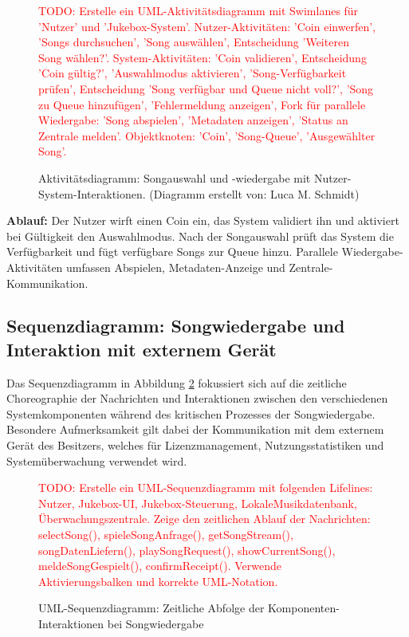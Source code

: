 \documentclass[12pt,oneside]{article}
\newcommand{\todo}[1]{\textcolor{red}{TODO: #1}}
\begin{document}
\begin{figure}[H]
    \centering
    \todo{Erstelle ein UML-Aktivitätsdiagramm mit Swimlanes für 'Nutzer' und 'Jukebox-System'. Nutzer-Aktivitäten: 'Coin einwerfen', 'Songs durchsuchen', 'Song auswählen', Entscheidung 'Weiteren Song wählen?'. System-Aktivitäten: 'Coin validieren', Entscheidung 'Coin gültig?', 'Auswahlmodus aktivieren', 'Song-Verfügbarkeit prüfen', Entscheidung 'Song verfügbar und Queue nicht voll?', 'Song zu Queue hinzufügen', 'Fehlermeldung anzeigen', Fork für parallele Wiedergabe: 'Song abspielen', 'Metadaten anzeigen', 'Status an Zentrale melden'. Objektknoten: 'Coin', 'Song-Queue', 'Ausgewählter Song'.}
    \caption{Aktivitätsdiagramm: Songauswahl und -wiedergabe mit Nutzer-System-Interaktionen. (Diagramm erstellt von: Luca M. Schmidt)}
    \label{fig:activity_diagram}
\end{figure}
\noindent
\textbf{Ablauf:} Der Nutzer wirft einen Coin ein, das System validiert ihn und aktiviert bei Gültigkeit den Auswahlmodus. Nach der Songauswahl prüft das System die Verfügbarkeit und fügt verfügbare Songs zur Queue hinzu. Parallele Wiedergabe-Aktivitäten umfassen Abspielen, Metadaten-Anzeige und Zentrale-Kommunikation.

\subsection{Sequenzdiagramm: Songwiedergabe und Interaktion mit externem Gerät}
Das Sequenzdiagramm in Abbildung \ref{fig:sequence_diagram} fokussiert sich auf die zeitliche Choreographie der Nachrichten und Interaktionen zwischen den verschiedenen Systemkomponenten während des kritischen Prozesses der Songwiedergabe. Besondere Aufmerksamkeit gilt dabei der Kommunikation mit dem externem Gerät des Besitzers, welches für Lizenzmanagement, Nutzungsstatistiken und Systemüberwachung verwendet wird.

\begin{figure}[H]
    \centering
    \todo{Erstelle ein UML-Sequenzdiagramm mit folgenden Lifelines: Nutzer, Jukebox-UI, Jukebox-Steuerung, LokaleMusikdatenbank, Überwachungszentrale. Zeige den zeitlichen Ablauf der Nachrichten: selectSong(), spieleSongAnfrage(), getSongStream(), songDatenLiefern(), playSongRequest(), showCurrentSong(), meldeSongGespielt(), confirmReceipt(). Verwende Aktivierungsbalken und korrekte UML-Notation.}
    \caption{UML-Sequenzdiagramm: Zeitliche Abfolge der Komponenten-Interaktionen bei Songwiedergabe}
    \label{fig:sequence_diagram}
\end{figure}
\end{document}
